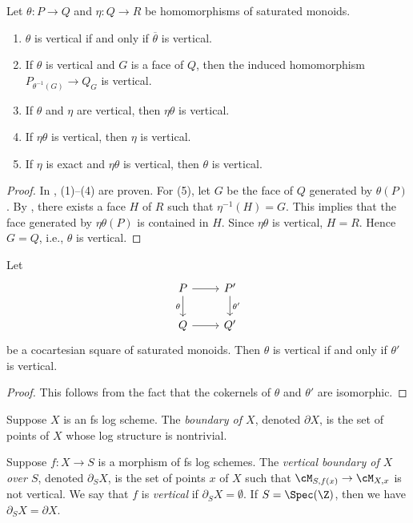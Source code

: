 \documentclass[10pt]{amsart}
\begin{document}
\begin{prop}
\label{vert.3}
Let $\theta\colon P\to Q$ and $\eta\colon Q\to R$ be homomorphisms of saturated monoids.
\begin{enumerate}
\item[{\rm (1)}]
$\theta$ is vertical if and only if $\overline{\theta}$ is vertical.
\item[{\rm (2)}]
If $\theta$ is vertical and $G$ is a face of $Q$, then the induced homomorphism $P_{\theta^{-1}(G)}\to Q_G$ is vertical.
\item[{\rm (3)}]
If $\theta$ and $\eta$ are vertical, then $\eta\theta$ is vertical.
\item[{\rm (4)}]
If $\eta\theta$ is vertical, then $\eta$ is vertical.
\item[{\rm (5)}]
If $\eta$ is exact and $\eta\theta$ is vertical, then $\theta$ is vertical.
\end{enumerate}
\end{prop}
\begin{proof}
In \cite[Proposition I.4.3.3]{Ogu}, (1)--(4) are proven.
For (5), let $G$ be the face of $Q$ generated by $\theta(P)$.
By \cite[Proposition I.4.2.2]{Ogu}, there exists a face $H$ of $R$ such that $\eta^{-1}(H)=G$.
This implies that the face generated by $\eta\theta(P)$ is contained in $H$.
Since $\eta\theta$ is vertical, $H=R$.
Hence $G=Q$, i.e., $\theta$ is vertical.
\end{proof}

\begin{prop}
\label{vert.10}
Let
\[
\begin{tikzcd}
P\ar[d,"\theta"']\ar[r]&
P'\ar[d,"\theta'"]
\\
Q\ar[r]&
Q'
\end{tikzcd}
\]
be a cocartesian square of saturated monoids.
Then $\theta$ is vertical if and only if $\theta'$ is vertical.
\end{prop}
\begin{proof}
This follows from the fact that the cokernels of $\theta$ and $\theta'$ are isomorphic.
\end{proof}

\begin{df}
Suppose $X$ is an fs log scheme.
The \emph{boundary of $X$}, denoted $\partial X$, is the set of points of $X$ whose log structure is nontrivial.
\end{df}

\begin{df}
\label{vert.1}
Suppose $f\colon X\to S$ is a morphism of fs log schemes.
The \emph{vertical boundary of $X$ over $S$}, denoted $\partial_S X$, is the set of points $x$ of $X$ such that $\cM_{S,f(x)}\to \cM_{X,x}$ is not vertical.
We say that $f$ is \emph{vertical} if $\partial_S X=\emptyset$.
If $S=\Spec(\Z)$, then we have $\partial_{S}X = \partial X$.
\end{df}
\end{document}
